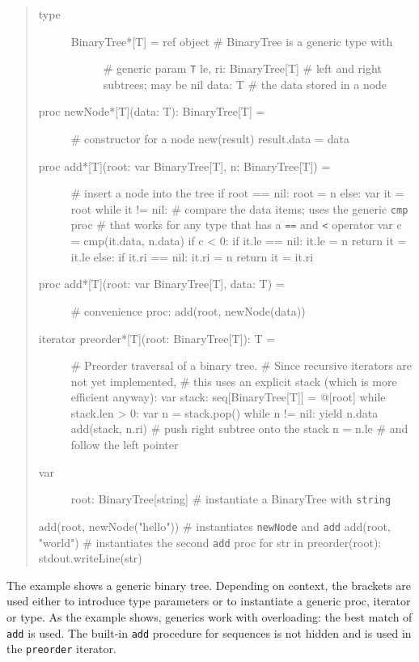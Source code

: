 \begin{quote}
\begin{description}
\item[type]
\begin{description}
\item[BinaryTree*{[}T{]} = ref object \# BinaryTree is a generic type
with]
\# generic param \texttt{T} le, ri: BinaryTree{[}T{]} \# left and right
subtrees; may be nil data: T \# the data stored in a node
\end{description}
\item[proc newNode*{[}T{]}(data: T): BinaryTree{[}T{]} =]
\# constructor for a node new(result) result.data = data
\item[proc add*{[}T{]}(root: var BinaryTree{[}T{]}, n:
BinaryTree{[}T{]}) =]
\# insert a node into the tree if root == nil: root = n else: var it =
root while it != nil: \# compare the data items; uses the generic
\texttt{cmp} proc \# that works for any type that has a \texttt{==} and
\texttt{\textless{}} operator var c = cmp(it.data, n.data) if c
\textless{} 0: if it.le == nil: it.le = n return it = it.le else: if
it.ri == nil: it.ri = n return it = it.ri
\item[proc add*{[}T{]}(root: var BinaryTree{[}T{]}, data: T) =]
\# convenience proc: add(root, newNode(data))
\item[iterator preorder*{[}T{]}(root: BinaryTree{[}T{]}): T =]
\# Preorder traversal of a binary tree. \# Since recursive iterators are
not yet implemented, \# this uses an explicit stack (which is more
efficient anyway): var stack: seq{[}BinaryTree{[}T{]}{]} = @{[}root{]}
while stack.len \textgreater{} 0: var n = stack.pop() while n != nil:
yield n.data add(stack, n.ri) \# push right subtree onto the stack n =
n.le \# and follow the left pointer
\item[var]
root: BinaryTree{[}string{]} \# instantiate a BinaryTree with
\texttt{string}
\end{description}

add(root, newNode("hello")) \# instantiates \texttt{newNode} and
\texttt{add} add(root, "world") \# instantiates the second \texttt{add}
proc for str in preorder(root): stdout.writeLine(str)
\end{quote}

The example shows a generic binary tree. Depending on context, the
brackets are used either to introduce type parameters or to instantiate
a generic proc, iterator or type. As the example shows, generics work
with overloading: the best match of \texttt{add} is used. The built-in
\texttt{add} procedure for sequences is not hidden and is used in the
\texttt{preorder} iterator.

